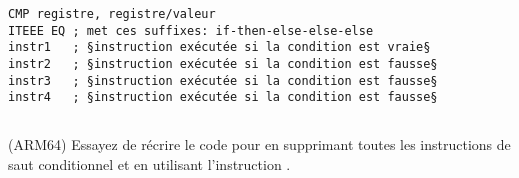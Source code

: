 \begin{lstlisting}[caption=ARM (\ThumbMode),style=customasmARM]
CMP registre, registre/valeur
ITEEE EQ ; met ces suffixes: if-then-else-else-else
instr1   ; §instruction exécutée si la condition est vraie§
instr2   ; §instruction exécutée si la condition est fausse§
instr3   ; §instruction exécutée si la condition est fausse§
instr4   ; §instruction exécutée si la condition est fausse§
\end{lstlisting}

\subsection{\Exercise}

(ARM64) Essayez de récrire le code pour  en supprimant toutes
les instructions de saut conditionnel et en utilisant l'instruction .

